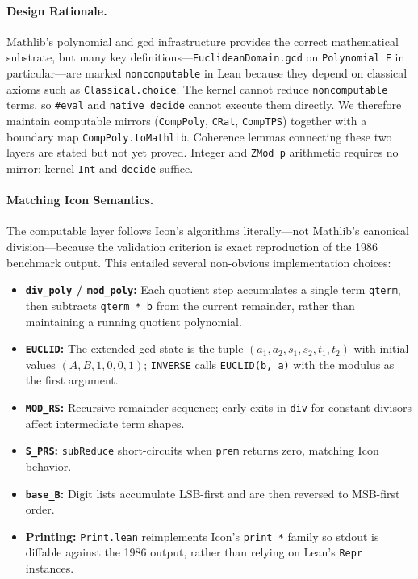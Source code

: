 \documentclass[11pt,a4paper]{article}
\begin{document}
\paragraph{Design Rationale.} Mathlib's polynomial and gcd infrastructure provides the correct mathematical substrate, but many key definitions---\texttt{EuclideanDomain.gcd} on \texttt{Polynomial F} in particular---are marked \texttt{noncomputable} in Lean because they depend on classical axioms such as \texttt{Classical.choice}. The kernel cannot reduce \texttt{noncomputable} terms, so \texttt{\#eval} and \texttt{native\_decide} cannot execute them directly. We therefore maintain computable mirrors (\texttt{CompPoly}, \texttt{CRat}, \texttt{CompTPS}) together with a boundary map \texttt{CompPoly.toMathlib}. Coherence lemmas connecting these two layers are stated but not yet proved. Integer and \texttt{ZMod p} arithmetic requires no mirror: kernel \texttt{Int} and \texttt{decide} suffice.

\paragraph{Matching Icon Semantics.} The computable layer follows Icon's algorithms literally---not Mathlib's canonical division---because the validation criterion is exact reproduction of the 1986 benchmark output. This entailed several non-obvious implementation choices:
\begin{itemize}
    \item \textbf{\texttt{div\_poly} / \texttt{mod\_poly}:} Each quotient step accumulates a single term \texttt{qterm}, then subtracts \texttt{qterm * b} from the current remainder, rather than maintaining a running quotient polynomial.
    \item \textbf{\texttt{EUCLID}:} The extended gcd state is the tuple $(a_1, a_2, s_1, s_2, t_1, t_2)$ with initial values $(A, B, 1, 0, 0, 1)$; \texttt{INVERSE} calls \texttt{EUCLID(b, a)} with the modulus as the first argument.
    \item \textbf{\texttt{MOD\_RS}:} Recursive remainder sequence; early exits in \texttt{div} for constant divisors affect intermediate term shapes.
    \item \textbf{\texttt{S\_PRS}:} \texttt{subReduce} short-circuits when \texttt{prem} returns zero, matching Icon behavior.
    \item \textbf{\texttt{base\_B}:} Digit lists accumulate LSB-first and are then reversed to MSB-first order.
    \item \textbf{Printing:} \texttt{Print.lean} reimplements Icon's \texttt{print\_*} family so stdout is diffable against the 1986 output, rather than relying on Lean's \texttt{Repr} instances.
\end{itemize}
\end{document}
